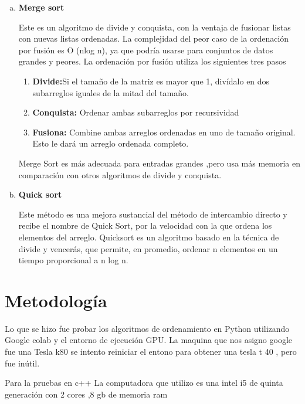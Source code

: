 \documentclass[a4paper]{article}
\begin{document}
\begin{enumerate}[a)]
\item \textbf{Merge sort}

Este es un algoritmo de divide y conquista, con la ventaja  de fusionar listas con nuevas listas ordenadas. La complejidad del peor caso de la ordenación por fusión es O (nlog n), ya que podría usarse para conjuntos de datos grandes y peores. 
La ordenación por fusión utiliza los siguientes tres pasos \cite{merge} 

\begin{enumerate}[1)]
\item \textbf{Divide:}Si el tamaño de la matriz es mayor que 1, divídalo en dos subarreglos iguales de la mitad del tamaño.
\item \textbf{Conquista:} Ordenar ambas subarreglos por recursividad
\item \textbf{Fusiona:} Combine ambas arreglos ordenadas en uno de tamaño original. Esto le dará un arreglo ordenada completo.


\end{enumerate}



 Merge Sort es más adecuada para entradas grandes ,pero usa más memoria en comparación con otros algoritmos de divide y conquista.

\item \textbf{Quick sort}

Este método es una mejora sustancial del método de intercambio directo y recibe el nombre de Quick Sort, por la velocidad con la que ordena los elementos del arreglo.
Quicksort es un algoritmo basado en la técnica de divide y vencerás, que permite, en promedio, ordenar n elementos en un tiempo proporcional a n log n.




\end{enumerate}




\section{Metodología}

Lo que se hizo fue probar los algoritmos de ordenamiento  en Python 
utilizando Google colab y el entorno de ejecución GPU. La maquina que nos asigno google fue una Tesla k80 se intento reiniciar el entono para obtener una tesla t 40 , pero fue inútil.

Para la pruebas en c++
La computadora  que utilizo es una intel i5 de quinta generación  con 2 cores ,8 gb  de memoria ram 
\end{document}

